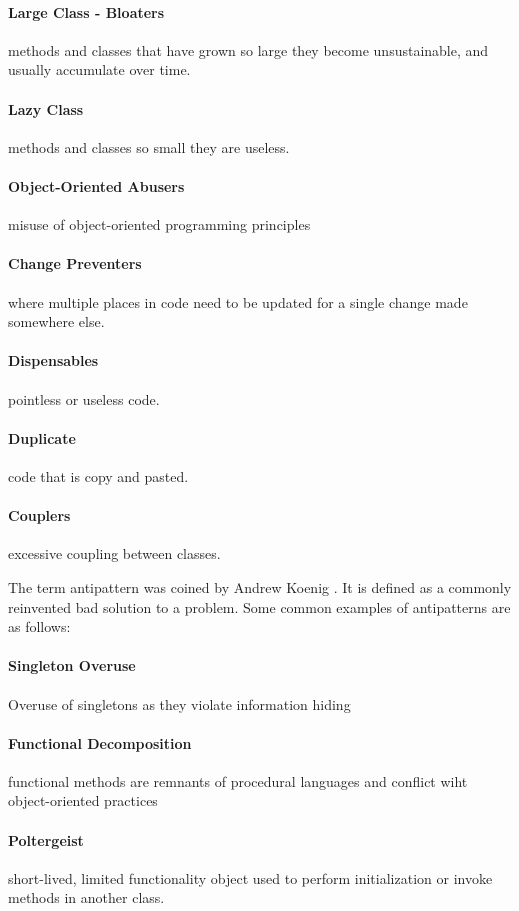\documentclass[conference]{IEEEtran}
\begin{document}
\paragraph{Large Class - Bloaters} methods and classes that have grown so large they become unsustainable, and usually accumulate over time.
\paragraph{Lazy Class} methods and classes so small they are useless.
\paragraph{Object-Oriented Abusers} misuse of object-oriented programming principles
\paragraph{Change Preventers} where multiple places in code need to be updated for a single change made somewhere else.
\paragraph{Dispensables} pointless or useless code.
\paragraph{Duplicate} code that is copy and pasted.
\paragraph{Couplers} excessive coupling between classes.

The term antipattern was coined by Andrew Koenig \cite{koenig_patterns_1998}. 
It is defined as a commonly reinvented bad solution to a problem.
Some common examples of antipatterns are as follows:
\paragraph{Singleton Overuse} Overuse of singletons as they violate information hiding
\paragraph{Functional Decomposition} functional methods are remnants of procedural languages and conflict wiht object-oriented practices
\paragraph{Poltergeist} short-lived, limited functionality object used to perform initialization or invoke methods in another class.
\end{document}
